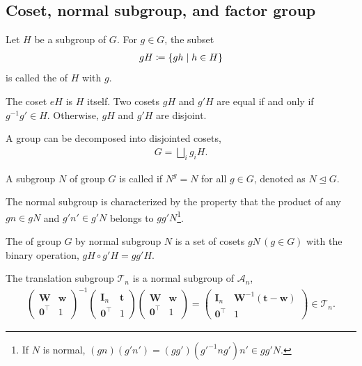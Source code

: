 \subsection{Coset, normal subgroup, and factor group}

\begin{screen}
  \begin{defn}[coset]
    Let $H$ be a subgroup of $G$.
    For $g \in G$, the subset
    \begin{align}
      gH \coloneqq \left\{  gh  \mathrel{}\middle|\mathrel{}  h \in H \right\}
    \end{align}
    is called the  of $H$ with  $g$.
  \end{defn}
\end{screen}
The coset $eH$ is $H$ itself.
Two cosets $gH$ and $g'H$ are equal if and only if $g^{-1}g' \in H$.
Otherwise, $gH$ and $g'H$ are disjoint.

A group can be decomposed into disjointed cosets,
\begin{align}
  G = \bigsqcup_{i} g_{i} H.
\end{align}

\begin{screen}
  \begin{defn}
    A subgroup $N$ of group $G$ is called  if $N^{g} = N$ for all $g \in G$, denoted as $N \trianglelefteq G$.
  \end{defn}
\end{screen}

The normal subgroup is characterized by the property that the product of any $gn \in gN$ and $g'n' \in g'N$ belongs to $gg'N$\footnote{
  If $N$ is normal, $(gn)(g'n') = (gg')(g'^{-1} n g') n' \in gg' N$.
}.

\begin{screen}
  \begin{defn}
    The  of group $G$ by normal subgroup $N$ is a set of cosets $gN \, (g \in G)$ with the binary operation, $gH \circ g'H = gg' H$.
  \end{defn}
\end{screen}

The translation subgroup $\mathcal{T}_{n}$ is a normal subgroup of $\mathcal{A}_{n}$,
\begin{align*}
  \begin{pmatrix} \bm{W} & \bm{w} \\ \bm{0}^{\top} & 1 \end{pmatrix}^{-1}
  \begin{pmatrix} \bm{I}_{n} & \bm{t} \\ \bm{0}^{\top} & 1 \end{pmatrix}
  \begin{pmatrix} \bm{W} & \bm{w} \\ \bm{0}^{\top} & 1 \end{pmatrix}
  =
  \begin{pmatrix} \bm{I}_{n} & \bm{W}^{-1} (\bm{t} - \bm{w}) \\ \bm{0}^{\top} & 1 \end{pmatrix}
  \in \mathcal{T}_{n}.
\end{align*}

